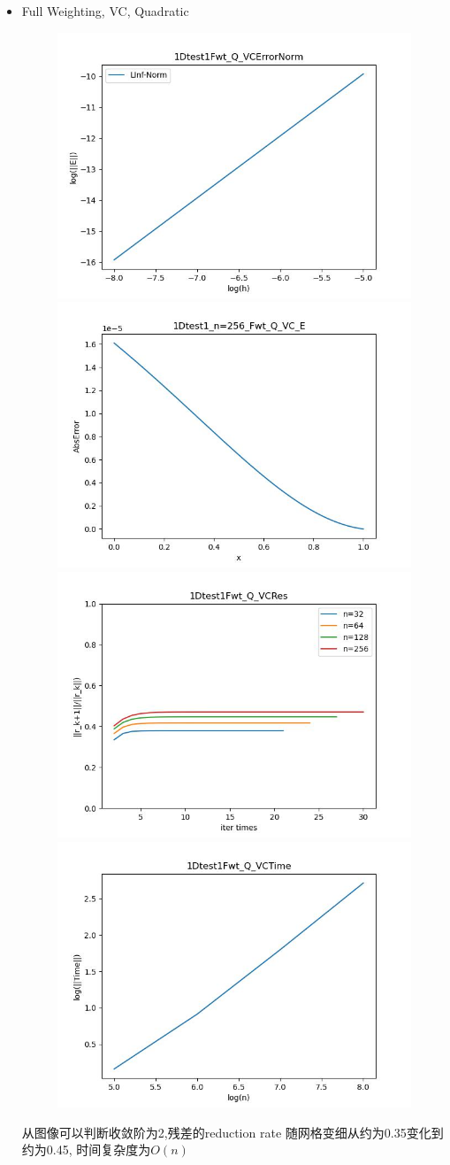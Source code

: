 \documentclass{article}
\begin{document}
\begin{itemize}
    \item Full Weighting, VC, Quadratic
    \begin{figure}[h]
        \centering
        \includegraphics[width=0.35\linewidth]{1Dtest1Fwt_Q_VCErrorNorm.jpg}
        \includegraphics[width=0.35\linewidth]{1Dtest1_n=256_Fwt_Q_VC_E.jpg}
        \includegraphics[width=0.35\linewidth]{1Dtest1Fwt_Q_VCRes.jpg}
        \includegraphics[width=0.35\linewidth]{1Dtest1Fwt_Q_VCTime.jpg}
    \end{figure}
    
    从图像可以判断收敛阶为2,残差的reduction rate 随网格变细从约为0.35变化到约为0.45, 时间复杂度为$O(n)$


\end{itemize}
\end{document}

